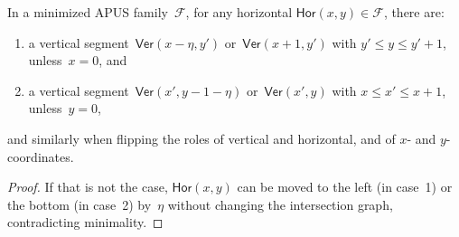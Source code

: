 \documentclass[a4paper,UKenglish,cleveref,thm-restate]{lipics-v2021}
\theoremstyle{remark}
\newcommand{\Fc}{\mathcal{F}}
\newcommand{\Vseg}{\mathsf{Ver}}
\newcommand{\Hseg}{\mathsf{Hor}}
\begin{document}
\begin{lemma}\label{lem:minimal-apus}
    In a minimized APUS family~$\Fc$, for any horizontal $\Hseg(x,y) \in \Fc$, there are:
    \begin{enumerate}
        \item \label{item:horiz-min} a vertical segment~$\Vseg(x-\eta,y')$ or~$\Vseg(x+1,y')$ with $y' \le y \le y'+1$, unless~$x=0$, and
        \item \label{item:vert-min} a vertical segment~$\Vseg(x',y-1-\eta)$ or~$\Vseg(x',y)$ with $x \le x' \le x+1$, unless~$y=0$,
    \end{enumerate}
    and similarly when flipping the roles of vertical and horizontal, and of $x$- and $y$-coordinates.
\end{lemma}
\begin{proof}
    If that is not the case, $\Hseg(x,y)$ can be moved to the left (in case~1) or the bottom (in case~2) by~$\eta$ without changing the intersection graph, contradicting minimality.
\end{proof}
\end{document}
